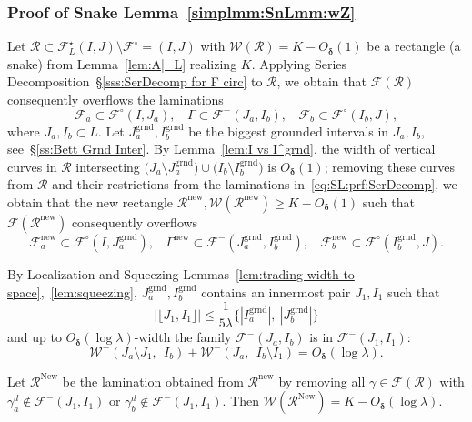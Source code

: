 \documentclass{amsart}
\renewcommand{\sp}{{\ \ }}
\newcommand{\1}{{\mathbb 1 }}
\newcommand{\Fam}{{\mathcal F}}
\newcommand{\Width}{{\mathcal W}}
\newcommand\RR{\mathcal{R}}
\newcommand{\str}{{\star}}
\newcommand{\grnd}{{\operatorname{grnd}}}
\newcommand\new{{\operatorname{new}}}
\newcommand\New{{\operatorname{New}}}
\theoremstyle{remark}
\numberwithin{equation}{section}
\theoremstyle{definition}
\newcommand{\bdelta}{{\boldsymbol{ \delta}}}
\begin{document}
\subsubsection{Proof of Snake Lemma~\ref{simplmm:SnLmm:wZ}}
\label{sss:Prf SnaekLmm} Let $\RR\subset\Fam_L^\str(I,J)\setminus \Fam^\circ= (I,J)$ with $\Width(\RR)=K-O_\bdelta(1)$ be a rectangle (a snake) from Lemma~\ref{lem:A|_L} realizing $K$.  Applying Series Decomposition~\S\ref{sss:SerDecomp for F circ} to $\RR$, we obtain that $\Fam(\RR)$ consequently overflows the laminations 
 \begin{equation}
 \label{eq:SL:prf:SerDecomp}
 \Fam_a\subset \Fam^\circ (I,J_a),\sp \sp \Gamma\subset \Fam^-(J_a,I_b),\sp \sp \Fam_b\subset \Fam^\circ (I_b, J),
 \end{equation}
where $J_a, I_b\subset L$. Let $J_a^\grnd, I_b^\grnd$ be the biggest grounded intervals in $J_a, I_b$, see~\S\ref{ss:Bett Grnd Inter}. By Lemma~\ref{lem:I vs I^grnd},  the width of vertical curves in $\RR$ intersecting $\big(J_a\setminus J^\grnd_a\big)\cup \big(I_b\setminus I^\grnd_b\big)$ is $O_\bdelta(1)$; removing these curves from $\RR$ and their restrictions from the laminations in~\eqref{eq:SL:prf:SerDecomp},  we obtain that the new rectangle $\RR^\new, \Width(\RR^\new)\ge K-O_\bdelta(1)$ such that  $\Fam(\RR^\new)$ consequently overflows
 \begin{equation}
 \label{eq:SL:prf:SerDecomp:2}
 \Fam^\new_a\subset \Fam^\circ (I,J^\grnd_a),\sp \sp \Gamma^\new\subset \Fam^-(J^\grnd_a,I^\grnd_b),\sp \sp \Fam^\new_b\subset \Fam^\circ (I^\grnd_b, J).
 \end{equation}  
 
 By Localization and Squeezing Lemmas~\ref{lem:trading  width to space},~\ref{lem:squeezing}, $J^\grnd_a, I^\grnd_b$ contains an innermost pair $J_1,I_1$ such that \[ |\lfloor J_1, I_1\rfloor |\le \frac 1 {5\lambda} \{|I^\grnd_a|,\ |J^\grnd_b|\}\]
and up to $O_\bdelta(\log \lambda)$-width the family $\Fam^-(J_a,I_b)$ is in  $\Fam^-(J_1,I_1)$:
\begin{equation}
\label{eq:SL:prf:Small Interv}
\Width^-(J_a\setminus J_1,\sp I_b) +\Width^-(J_a,\sp I_b\setminus I_1)=O_\bdelta(\log \lambda).
\end{equation}
 
Let $\RR^\New$ be the lamination obtained from $\RR^\new$ by removing all $\gamma\in \Fam(\RR)$ with $\gamma_a^d\not \in \Fam^-(J_1,I_1)$ or  $\gamma_b^d\not \in \Fam^-(J_1,I_1)$.  Then $\Width(\RR^\New)=K-O_\bdelta(\log \lambda)$. 
\end{document}
